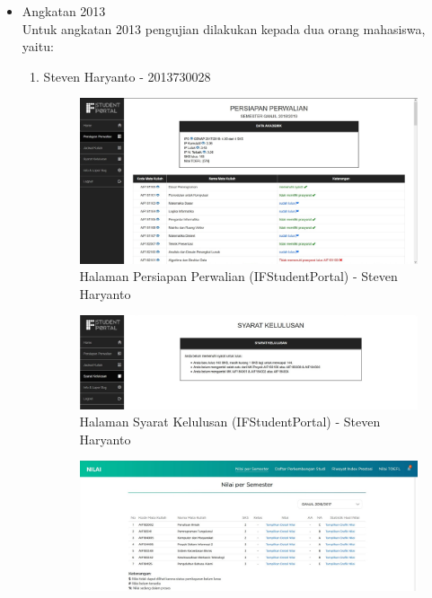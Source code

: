 \begin{itemize}
	\item Angkatan 2013 \\
	Untuk angkatan 2013 pengujian dilakukan kepada dua orang mahasiswa, yaitu:
	\begin{enumerate}
		\item Steven Haryanto - 2013730028 \\
		\begin{figure}[H]
			\centering
			\includegraphics[scale=0.425]{Gambar/HasilPengujian/2013_1_persiapan_perwalian_ifstudentportal}
			\caption{Halaman Persiapan Perwalian (IFStudentPortal) - Steven Haryanto}
			\label{fig:2013_1_persiapan_perwalian_ifstudentportal}
		\end{figure}
		\begin{figure}[H]
			\centering
			\includegraphics[scale=0.425]{Gambar/HasilPengujian/2013_1_syarat_kelulusan_ifstudentportal}
			\caption{Halaman Syarat Kelulusan (IFStudentPortal) - Steven Haryanto}
			\label{fig:2013_1_syarat_kelulusan_ifstudentportal}
		\end{figure}
		\begin{figure}[H]
			\centering
			\includegraphics[scale=0.4]{Gambar/HasilPengujian/2013_1_nps_studentportal}

\end{figure}
\end{enumerate}
\end{itemize}
